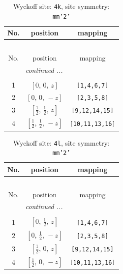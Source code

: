 \documentclass[fleqn,8pt]{jsarticle}
\begin{document}
\renewcommand{\arraystretch}{1.2}
\begin{longtable}{ccc}
\caption{Wyckoff site: {\tt 4k}, site symmetry: {\tt mm'2'}}
 \\
 \hline \hline
No. & position & mapping \\ \hline \endfirsthead

\multicolumn{2}{l}{\tablename\ \thetable{}} \\
 \hline \hline
No. & position & mapping \\ \hline \endhead

 \hline \hline
\multicolumn{2}{r}{\footnotesize\it continued ...} \\ \endfoot

 \hline \hline
\multicolumn{2}{r}{} \\ \endlastfoot

1 & $\left[ 0,\, 0,\, z \right]$ & {\tt [1,4,6,7]} \\ \hline
2 & $\left[ 0,\, 0,\, - z \right]$ & {\tt [2,3,5,8]} \\ \hline
3 & $\left[ \frac{1}{2},\, \frac{1}{2},\, z \right]$ & {\tt [9,12,14,15]} \\ \hline
4 & $\left[ \frac{1}{2},\, \frac{1}{2},\, - z \right]$ & {\tt [10,11,13,16]} \\
\end{longtable}
\renewcommand{\arraystretch}{1.2}
\begin{longtable}{ccc}
\caption{Wyckoff site: {\tt 4l}, site symmetry: {\tt mm'2'}}
 \\
 \hline \hline
No. & position & mapping \\ \hline \endfirsthead

\multicolumn{2}{l}{\tablename\ \thetable{}} \\
 \hline \hline
No. & position & mapping \\ \hline \endhead

 \hline \hline
\multicolumn{2}{r}{\footnotesize\it continued ...} \\ \endfoot

 \hline \hline
\multicolumn{2}{r}{} \\ \endlastfoot

1 & $\left[ 0,\, \frac{1}{2},\, z \right]$ & {\tt [1,4,6,7]} \\ \hline
2 & $\left[ 0,\, \frac{1}{2},\, - z \right]$ & {\tt [2,3,5,8]} \\ \hline
3 & $\left[ \frac{1}{2},\, 0,\, z \right]$ & {\tt [9,12,14,15]} \\ \hline
4 & $\left[ \frac{1}{2},\, 0,\, - z \right]$ & {\tt [10,11,13,16]} \\
\end{longtable}
\end{document}
